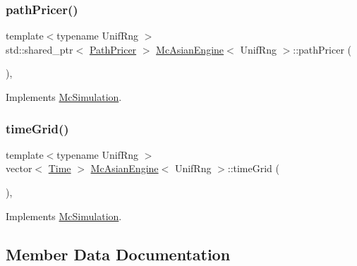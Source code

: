 \hypertarget{class_mc_asian_engine_afb903df1f8e0023a1f6bfae43ccbc8f7}{}\label{class_mc_asian_engine_afb903df1f8e0023a1f6bfae43ccbc8f7} 
\subsubsection{\texorpdfstring{path\+Pricer()}{pathPricer()}}
{\footnotesize\ttfamily template$<$typename Unif\+Rng $>$ \\
std\+::shared\+\_\+ptr$<$ \hyperlink{class_path_pricer}{Path\+Pricer} $>$ \hyperlink{class_mc_asian_engine}{Mc\+Asian\+Engine}$<$ Unif\+Rng $>$\+::path\+Pricer (\begin{DoxyParamCaption}{ }\end{DoxyParamCaption})\hspace{0.3cm}{\ttfamily [override]}, {\ttfamily [virtual]}}



Implements \hyperlink{class_mc_simulation_a3182a27c79d31cfb65e9a1a6b60f5391}{Mc\+Simulation}.

\hypertarget{class_mc_asian_engine_a4c16366e8dec7d689e934cbafe413332}{}\label{class_mc_asian_engine_a4c16366e8dec7d689e934cbafe413332} 
\subsubsection{\texorpdfstring{time\+Grid()}{timeGrid()}}
{\footnotesize\ttfamily template$<$typename Unif\+Rng $>$ \\
vector$<$ \hyperlink{_name_def_8h_ac2d3e0ba793497bcca555c7c2cf64ff3}{Time} $>$ \hyperlink{class_mc_asian_engine}{Mc\+Asian\+Engine}$<$ Unif\+Rng $>$\+::time\+Grid (\begin{DoxyParamCaption}{ }\end{DoxyParamCaption})\hspace{0.3cm}{\ttfamily [override]}, {\ttfamily [virtual]}}



Implements \hyperlink{class_mc_simulation_a71f4b6eedd90f057203a94467a691387}{Mc\+Simulation}.



\subsection{Member Data Documentation}
\hypertarget{class_mc_asian_engine_adbc09c299d05335c926179154fd52eca}{}\label{class_mc_asian_engine_adbc09c299d05335c926179154fd52eca} 
